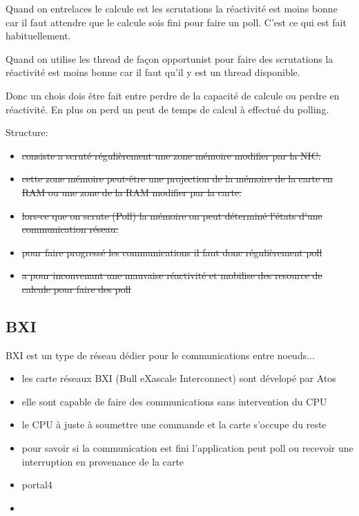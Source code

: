 Quand on entrelaces le calcule est les scrutations la réactivité est moins bonne car il faut attendre que le calcule sois fini pour faire un poll.
C'est ce qui est fait habituellement.

Quand on utilise les thread de façon opportunist pour faire des scrutations la réactivité est moins bonne car il faut qu'il y est un thread disponible.

Donc un chois dois être fait entre perdre de la capacité de calcule ou perdre en réactivité.
En plus on perd un peut de temps de calcul à effectué du polling.

Structure:
\begin{itemize}
  \item \st{consiste a scruté régulièrement une zone mémoire modifier par la NIC.}
  \item \st{cette zone mémoire peut-être une projection de la mémoire de la carte en RAM ou une zone de la RAM modifier par la carte.}
  \item \st{lors-ce que on scrute (Poll) la mémoire on peut déterminé l'états d'une communication réseau.}
  \item \st{pour faire progressé les communications il faut donc régulièrement poll}
  \item \st{a pour inconvenant une mauvaise réactivité et mobilise des resource de calcule pour faire des poll}
\end{itemize}

\subsection{BXI}

BXI est un type de réseau dédier pour le communications entre noeuds...

\begin{itemize}
  \item les carte réseaux BXI (Bull eXascale Interconnect) sont dévelopé par Atos
  \item elle sont capable de faire des communications sans intervention du CPU %
  \item le CPU à juste à soumettre une commande et la carte s'occupe du reste
  \item pour savoir si la communication est fini l'application peut poll ou recevoir une interruption en provenance de la carte
  \item portal4
  \item 
\end{itemize}

